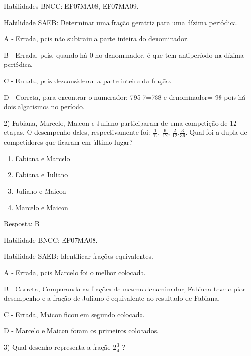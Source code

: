 {{{Habilidades BNCC: EF07MA08, EF07MA09.

Habilidade SAEB: Determinar uma fração geratriz para uma dízima
periódica.

A - Errada, pois não subtraiu a parte inteira do denominador.

B - Errada, pois, quando há 0 no denominador, é que tem antiperíodo na
dízima periódica.

C - Errada, pois desconsiderou a parte inteira da fração.

D - Correta, para encontrar o numerador: 795-7=788 e denominador= 99
pois há dois algarismos no período.

2) Fabiana, Marcelo, Maicon e Juliano participaram de uma competição de
12 etapas. O desempenho deles, respectivamente foi: \(\frac{1}{12}\),
\(\frac{6}{12}\), \(\frac{2}{12}\),\(\frac{3}{36}\). Qual foi a dupla de
competidores que ficaram em último lugar?

\begin{enumerate}
\def\labelenumi{\alph{enumi})}
\item
  Fabiana e Marcelo
\item
  Fabiana e Juliano
\item
  Juliano e Maicon
\item
  Marcelo e Maicon
\end{enumerate}

Resposta: B

Habilidade BNCC: EF07MA08.

Habilidade SAEB: Identificar frações equivalentes.

A - Errada, pois Marcelo foi o melhor colocado.

B - Correta, Comparando as frações de mesmo denominador, Fabiana teve o
pior desempenho e a fração de Juliano é equivalente ao resultado de
Fabiana.

C - Errada, Maicon ficou em segundo colocado.

D - Marcelo e Maicon foram os primeiros colocados.

3) Qual desenho representa a fração \(2\frac{3}{4}\) ?

}}}
